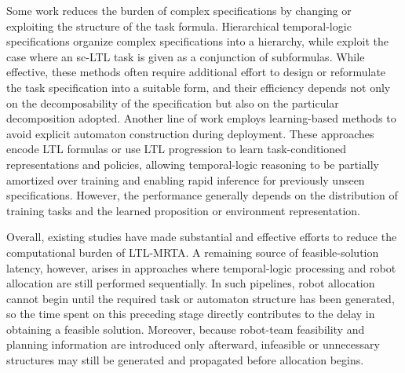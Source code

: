 \documentclass[lettersize,journal]{IEEEtran}
\theoremstyle{italiclemma}
\theoremstyle{italiclemma}
\theoremstyle{definition}
\begin{document}
Some work reduces the burden of complex specifications by changing or exploiting the structure of the task formula\cite{luo2024decomposition,2025Nl2Hltl2Plan, Finkbeiner2022}. Hierarchical temporal-logic specifications \cite{luo2025simultaneous} organize complex specifications into a hierarchy, while \cite{research0337} exploit the case where an sc-LTL task is given as a conjunction of subformulas. While effective, these methods often require additional effort to design or reformulate the task specification into a suitable form, and their efficiency depends not only on the decomposability of the specification but also on the particular decomposition adopted\cite{Specification}. Another line of work employs learning-based methods to avoid explicit automaton construction during deployment\cite{vaezipoor2021ltl2action, 9341325, 9803859, 10167731, 11570807}. These approaches encode LTL formulas or use LTL progression to learn task-conditioned representations and policies, allowing temporal-logic reasoning to be partially amortized over training and enabling rapid inference for previously unseen specifications. However, the performance generally depends on the distribution of training tasks and the learned proposition or environment representation.

Overall, existing studies have made substantial and effective efforts to reduce the computational burden of LTL-MRTA. A remaining source of feasible-solution latency, however, arises in approaches where temporal-logic processing and robot allocation are still performed sequentially. In such pipelines, robot allocation cannot begin until the required task or automaton structure has been generated, so the time spent on this preceding stage directly contributes to the delay in obtaining a feasible solution. Moreover, because robot-team feasibility and planning information are introduced only afterward, infeasible or unnecessary structures may still be generated and propagated before allocation begins.

\end{document}
